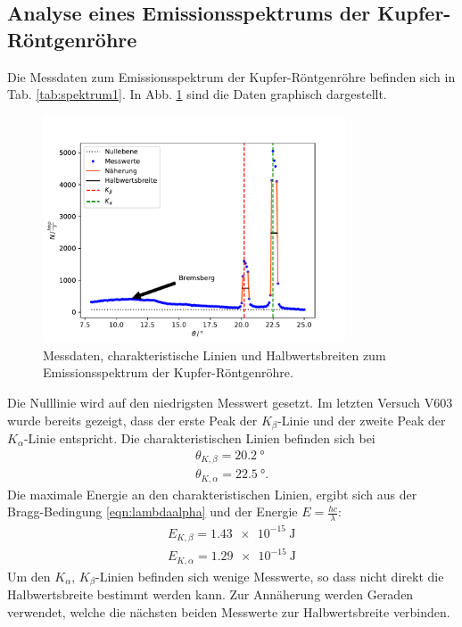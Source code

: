 \subsection{Analyse eines Emissionsspektrums der Kupfer-Röntgenröhre}
Die Messdaten zum Emissionsspektrum der Kupfer-Röntgenröhre befinden sich in Tab. \ref{tab:spektrum1}.
In Abb. \ref{fig:emission} sind die Daten graphisch dargestellt.
\begin{figure}
    \centering
    \includegraphics[width=0.8\textwidth]{content/data/plot.pdf}
    \caption{Messdaten, charakteristische Linien und Halbwertsbreiten zum Emissionsspektrum der Kupfer-Röntgenröhre. \cite{numpy} \cite{matplotlib} \cite{scipy}}
    \label{fig:emission}
\end{figure}
Die Nulllinie wird auf den niedrigsten Messwert gesetzt.
Im letzten Versuch V603 wurde bereits gezeigt, dass der erste Peak der $K_\beta$-Linie und der zweite Peak der $K_\alpha$-Linie entspricht.
Die charakteristischen Linien befinden sich bei
\begin{align*}
    \theta_{K,\beta} = \SI{20.2}{\degree} \\
    \theta_{K,\alpha} = \SI{22.5}{\degree} .
\end{align*}
Die maximale Energie an den charakteristischen Linien, ergibt sich aus der Bragg-Bedingung \eqref{eqn:lambdaalpha} und der Energie $E = \frac{hc}{\lambda}$:
\begin{align*}
    E_{K,\beta} = \SI{1.43e-15}{\joule} \\
    E_{K,\alpha} = \SI{1.29e-15}{\joule}
\end{align*}
Um den $K_\alpha$, $K_\beta$-Linien befinden sich wenige Messwerte, so dass nicht direkt die Halbwertsbreite bestimmt werden kann.
Zur Annäherung werden Geraden verwendet, welche die nächsten beiden Messwerte zur Halbwertsbreite verbinden.
